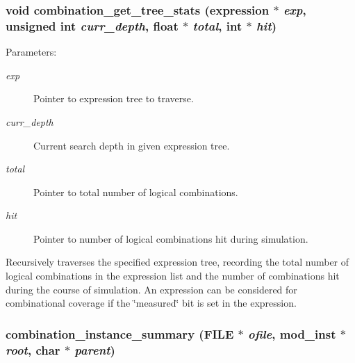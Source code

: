 \subsubsection{\setlength{\rightskip}{0pt plus 5cm}void combination\_\-get\_\-tree\_\-stats ({\bf expression} $\ast$ {\em exp}, unsigned int {\em curr\_\-depth}, float $\ast$ {\em total}, int $\ast$ {\em hit})}\label{comb_8c_a7}


\begin{Desc}
\item[Parameters: ]\par
\begin{description}
\item[{\em 
exp}]Pointer to expression tree to traverse. \item[{\em 
curr\_\-depth}]Current search depth in given expression tree. \item[{\em 
total}]Pointer to total number of logical combinations. \item[{\em 
hit}]Pointer to number of logical combinations hit during simulation.\end{description}
\end{Desc}
Recursively traverses the specified expression tree, recording the total number of logical combinations in the expression list and the number of combinations hit during the course of simulation. An expression can be considered for combinational coverage if the \char`\"{}measured\char`\"{} bit is set in the expression. 
\subsubsection{ combination\_\-instance\_\-summary (FILE $\ast$ {\em ofile}, {\bf mod\_\-inst} $\ast$ {\em root}, char $\ast$ {\em parent})}\label{comb_8c_a9}


